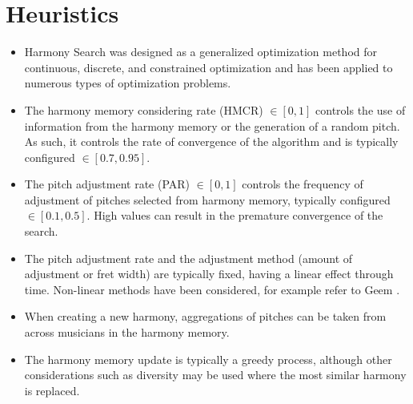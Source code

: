 \documentclass[a4paper, 11pt]{article}
\begin{document}
\section{Heuristics}
\label{sec:heuristics}
\begin{itemize}
	\item Harmony Search was designed as a generalized optimization method for continuous, discrete, and constrained optimization and has been applied to numerous types of optimization problems.
	\item The harmony memory considering rate (HMCR) $\in [0,1]$ controls the use of information from the harmony memory or the generation of a random pitch. As such, it controls the rate of convergence of the algorithm and is typically configured $\in [0.7,0.95]$.
	\item The pitch adjustment rate (PAR) $\in [0,1]$ controls the frequency of adjustment of pitches selected from harmony memory, typically configured $\in [0.1,0.5]$. High values can result in the premature convergence of the search.
	\item The pitch adjustment rate and the adjustment method (amount of adjustment or fret width) are typically fixed, having a linear effect through time. Non-linear methods have been considered, for example refer to Geem \cite{Geem2010a}.
	\item When creating a new harmony, aggregations of pitches can be taken from across musicians in the harmony memory.
	\item The harmony memory update is typically a greedy process, although other considerations such as diversity may be used where the most similar harmony is replaced.
\end{itemize}

\end{document}
